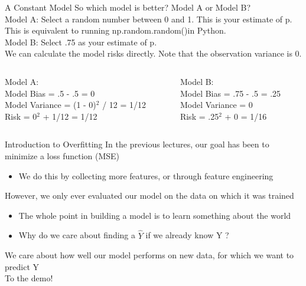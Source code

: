 \documentclass[aspectratio=169]{../latex_main/tntbeamer}  %
\begin{document}
	
	\begin{frame}[c]{A Constant Model}
	    So which model is better? Model A or Model B?\\
	    \bigskip
	    Model A: Select a random number between 0 and 1. This is your estimate of p. This is equivalent to running np.random.random()in Python.\\
        Model B: Select .75 as your estimate of p.\\
        \bigskip
        We can calculate the model risks directly. Note that the observation variance is 0.
        \begin{columns}
            \begin{column}{.4\textwidth}
                  Model A:\\
                  \bigskip
                  Model Bias = .5 - .5 = 0\\
                  Model Variance = (1 - 0)$^2$ / 12 = 1/12\\
                  \bigskip
                  Risk = 0$^2$ + 1/12 = 1/12
            \end{column}
            
            
            \begin{column}{.4\textwidth}
                   Model B:\\
                  \bigskip
                  Model Bias = .75 - .5 = .25\\
                  Model Variance = 0\\

                  \bigskip
                  Risk = .25$^2$ + 0 = 1/16
 
            \end{column}
        \end{columns}

	\end{frame}
	
	
	\begin{frame}{Introduction to Overfitting}
	    In the previous lectures, our goal has been to minimize a loss function (MSE)
	    \begin{itemize}
	        \item We do this by collecting more features, or through feature engineering
	    \end{itemize}
	    \bigskip
	    However, we only ever evaluated our model on the data on which it was trained
	    \begin{itemize}
	        \item The whole point in building a model is to learn something about the world
	        \item Why do we care about finding a   $\hat{Y}$   if we already know   Y  ?
	    \end{itemize}
	    \bigskip
	    We care about how well our model performs on new data, for which we want to predict Y\\
	    \bigskip
	    To the demo!
	\end{frame}
	
\end{document}
